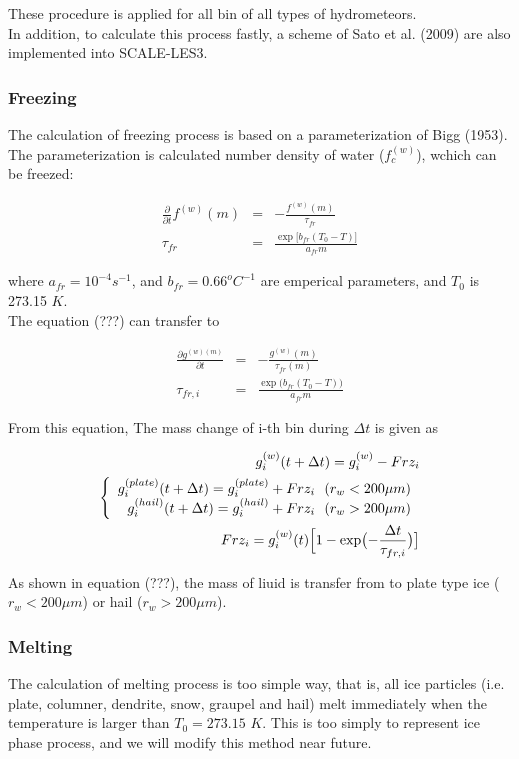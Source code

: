 These procedure is applied for all bin of all types of hydrometeors.\\
In addition, to calculate this process fastly, a scheme of Sato et al. (2009) are also implemented into SCALE-LES3.

\subsubsection{Freezing}
The calculation of freezing process is based on a parameterization of Bigg (1953). The parameterization is calculated number density of water ($f_{c}^{(w)}$), wchich can be freezed:

\begin{eqnarray}
\frac{\partial}{\partial t}f^{(w)}(m)&=&-\frac{f^{(w)}(m)}{\tau_{fr}}\\
\tau_{fr}&=&\frac{\exp \bigl[b_{fr}(T_{0}-T)\bigr]}{a_{fr} m}\nonumber
\end{eqnarray}

where $a_{fr}=10^{-4}s^{-1}$, and $b_{fr}=0.66^{o}C^{-1}$ are emperical parameters, and $T_{0}$ is 273.15 $K$.\\
The equation (???) can transfer to

\begin{eqnarray}
\frac{\partial g^{(w)(m)}}{\partial t}&=&-\frac{g^{(w)}(m)}{\tau_{fr}(m)}\\
\tau_{fr,i}&=&\frac{\exp\bigl (b_{fr}(T_{0}-T)\bigr )}{a_{fr}m}\nonumber
\end{eqnarray}

From this equation, The mass change of i-th bin during $\Delta t$ is given as

\begin{eqnarray}
g_{i}^{(w)}(t+\Delta t)=g_{i}^{(w)}-Frz_{i}\\
\left \{
\begin{array}{r}
g_{i}^{(plate)}(t+\Delta t)=g_{i}^{(plate)}+Frz_{i}\:\:\: (r_{w}<200\mu m)\\
g_{i}^{(hail)}(t+\Delta t)=g_{i}^{(hail)}+Frz_{i}\:\:\: (r_{w}>200\mu m)
\end{array} \right.\\
Frz_{i}=g_{i}^{(w)}(t)\Bigl [1-\exp\bigl (-\frac{\Delta t}{\tau_{fr,i}}\bigr )\bigr]\nonumber
\end{eqnarray}


 As shown in equation (???), the mass of liuid is transfer from to plate type ice ($r_{w}<200\mu m$) or hail ($r_{w}>200\mu m$).

\subsubsection{Melting}
The calculation of melting process is too simple way, that is, all ice particles (i.e. plate, columner, dendrite, snow, graupel and hail) melt immediately when the temperature is larger than $T_{0}=273.15$ $K$. This is too simply to represent ice phase process, and we will modify this method near future.

